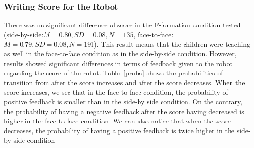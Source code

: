 \documentclass[letterpaper, 10 pt, conference]{ieeeconf}  %
\begin{document}
\subsubsection{Writing Score for the Robot}
There was no significant difference of score in the F-formation condition tested (side-by-side:$M=0.80, SD=0.08, N=135$, face-to-face: $M=0.79, SD=0.08, N=191$).
This result means that the children were teaching as well in the face-to-face condition as in the side-by-side condition.
However, results showed significant differences in terms of feedback given to the robot regarding the score of the robot.
Table~\ref{proba} shows the probabilities of transition from after the score increases and after the score decreases.
When the score increases, we see that in the face-to-face condition, the probability of positive feedback is smaller than in the side-by side condition.
On the contrary, the probability of having a negative feedback after the score having decreased is higher in the face-to-face condition.
We can also notice that when the score decreases, the probability of having a positive feedback is twice higher in the side-by-side condition
\end{document}
